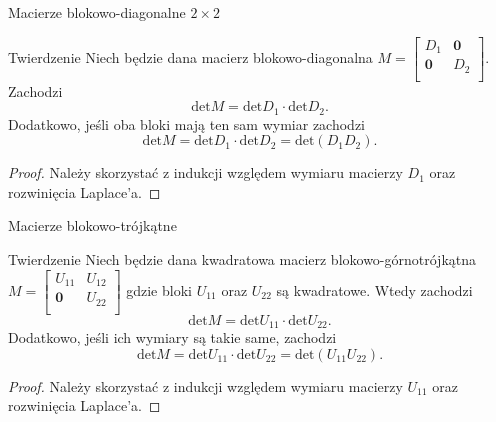 \documentclass{beamer}
\newcommand{\zero}{\mathbf{0}}
\renewcommand{\det}{\textrm{det}}
\begin{document}
\begin{frame}{Macierze blokowo-diagonalne $2 \times 2$}
    \begin{block}{Twierdzenie}
        Niech będzie dana macierz blokowo-diagonalna $M = \begin{bmatrix}
            D_1 & \zero \\ \zero& D_2 \\ 
        \end{bmatrix}$. Zachodzi 
        $$ \det M = \det D_1 \cdot \det D_2 .$$
         Dodatkowo, jeśli oba bloki mają ten sam wymiar zachodzi $$ \det M = \det D_1 \cdot \det D_2 =  \det(D_1  D_2).$$
    \end{block}
    \pause
    \begin{proof}
        Należy skorzystać z indukcji względem wymiaru macierzy $D_1$ oraz rozwinięcia Laplace'a.
    \end{proof}
\end{frame}

\begin{frame}{Macierze blokowo-trójkątne}
    \begin{block}{Twierdzenie}
        Niech będzie dana kwadratowa macierz blokowo-górnotrójkątna $M = \begin{bmatrix}
            U_{11} & U_{12} \\  \zero & U_{22} \\ 
        \end{bmatrix}$ gdzie bloki $U_{11}$ oraz $U_{22}$ są kwadratowe. Wtedy zachodzi 
        $$\det M = \det U_{11} \cdot \det U_{22}.$$ 
        Dodatkowo, jeśli ich wymiary są takie same, zachodzi 
        $$\det M = \det U_{11} \cdot \det U_{22} = \det (U_{11} U_{22}).$$
    \end{block}
    \pause
    \begin{proof}
        Należy skorzystać z indukcji względem wymiaru macierzy $U_{11}$ oraz rozwinięcia Laplace'a.
    \end{proof}
\end{frame}
\end{document}
